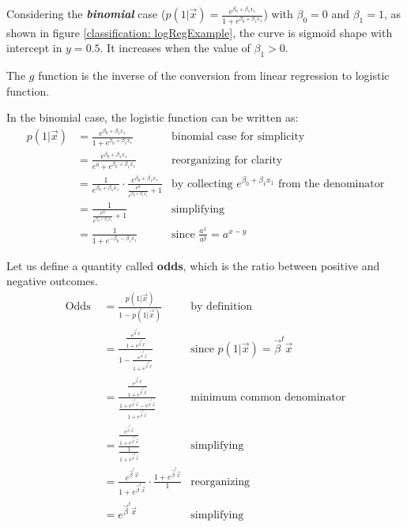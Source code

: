     Considering the \textbf{\textit{binomial}} case ($p(1|\vec{x}) =
    \frac{e^{\beta_0 + \beta_1 x_1}}{1+e^{\beta_0 + \beta_1 x_1}}$) with
    $\beta_0 = 0$ and $\beta_1 = 1$, as shown in figure \ref{classification:
    logRegExample}, the curve is sigmoid shape with intercept in $y=0.5$. It
    increases when the value of $\beta_1 > 0$.
    
    The $g$ function is the inverse of the conversion from linear regression to
    logistic function. %
    
    In the binomial case, the logistic function can be written as:
	\begin{align*}
	  p(1|\vec{x}) & = \frac{e^{\beta_0 + \beta_1 x_1}} {1+e^{\beta_0 + \beta_1 x_1}}
	               & \text{binomial case for simplicity} \\
	               & = \frac{e^{\beta_0 + \beta_1 x_1}} {e^0+e^{\beta_0 + \beta_1 x_1}}
	               & \text{reorganizing for clarity} \\
	               & = \frac{1}{e^{\beta_0 + \beta_1 x_1}} \cdot \frac{e^{\beta_0 + \beta_1 x_1}}{\frac{e^0}{e^{\beta_0 + \beta_1 x_1}} + 1}
	               & \text{by collecting } e^{\beta_0 + \beta_1 x_1} \text{ from the denominator}\\
	               & = \frac{1}{\frac{e^0}{e^{\beta_0 + \beta_1 x_1}} + 1} 
	               & \text{simplifying}\\ 
	               & = \frac{1}{1 + e^{-\beta_0 - \beta_1 x_1}}
	               & \text{since } \frac{a^x}{a^y} = a^{x-y}
	\end{align*}

	
    Let us define a quantity called \textbf{odds}, which is the ratio between
    positive and negative outcomes.
	\begin{align*}
	  \text{Odds } &= \frac{p(1|\vec{x})}{1 - p(1|\vec{x})}
	               & \text{by definition}\\
	               &= \frac{\frac{e^{\vec{\beta}^t\vec{x}}}{1 + e^{\vec{\beta}^t\vec{x}}}}
	                       {1 - \frac{e^{\vec{\beta}^t\vec{x}}}{1 + e^{\vec{\beta}^t\vec{x}}}}
	               & \text{since } p(1|\vec{x}) = \vec{\beta}^t\vec{x} \\
	               &= \frac{\frac{e^{\vec{\beta}^t\vec{x}}}{1 + e^{\vec{\beta}^t\vec{x}}}}
	                       {\frac{1 + e^{\vec{\beta}^t\vec{x}} - e^{\vec{\beta}^t\vec{x}}}{1 + e^{\vec{\beta}^t\vec{x}}}}
	               & \text{minimum common denominator}\\
	               &= \frac{\frac{e^{\vec{\beta}^t\vec{x}}}{1 + e^{\vec{\beta}^t\vec{x}}}}
	                       {\frac{1}{1 + e^{\vec{\beta}^t\vec{x}}}}
	               & \text{simplifying}\\
	               &= \frac{e^{\vec{\beta}^t\vec{x}}}{1 + e^{\vec{\beta}^t\vec{x}}} \cdot
	                       \frac{1 + e^{\vec{\beta}^t\vec{x}}}{1}
	               & \text{reorganizing}\\
	               &= e^{\vec{\beta}^t\vec{x}}
	               & \text{simplifying}\\
	\end{align*}
    
